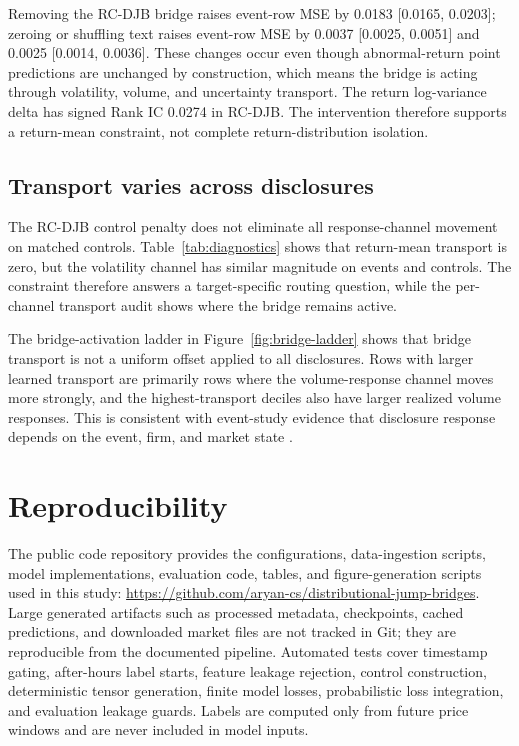 \documentclass[10pt,letterpaper]{article}
\begin{document}
Removing the RC-DJB bridge raises event-row MSE by 0.0183 [0.0165, 0.0203]; zeroing or shuffling
text raises event-row MSE by 0.0037 [0.0025, 0.0051] and 0.0025 [0.0014, 0.0036]. These changes
occur even though abnormal-return point predictions are unchanged by construction, which means the
bridge is acting through volatility, volume, and uncertainty transport. The return log-variance
delta has signed Rank IC 0.0274 in RC-DJB. The intervention therefore supports a return-mean
constraint, not complete return-distribution isolation.

\subsection{Transport varies across disclosures}
The RC-DJB control penalty does not eliminate all response-channel movement on matched controls.
Table~\ref{tab:diagnostics} shows that return-mean transport is zero, but the volatility channel
has similar magnitude on events and controls. The constraint therefore answers a target-specific
routing question, while the per-channel transport audit shows where the bridge remains active.

The bridge-activation ladder in Figure~\ref{fig:bridge-ladder} shows that bridge transport is not a
uniform offset applied to all disclosures. Rows with larger learned transport are primarily rows
where the volume-response channel moves more strongly, and the highest-transport deciles also have
larger realized volume responses. This is consistent with event-study evidence that disclosure
response depends on the event, firm, and market state
\citep{beaver1968information,patell1984anticipated,kothari2007econometrics}.

\section{Reproducibility}

The public code repository provides the configurations, data-ingestion scripts, model
implementations, evaluation code, tables, and figure-generation scripts used in this study:
\url{https://github.com/aryan-cs/distributional-jump-bridges}. Large generated artifacts such as processed
metadata, checkpoints, cached predictions, and downloaded market files are not tracked in Git; they
are reproducible from the documented pipeline. Automated tests cover timestamp gating, after-hours
label starts, feature leakage rejection, control construction, deterministic tensor generation,
finite model losses, probabilistic loss integration, and evaluation leakage guards. Labels are
computed only from future price windows and are never included in model inputs.
\end{document}
